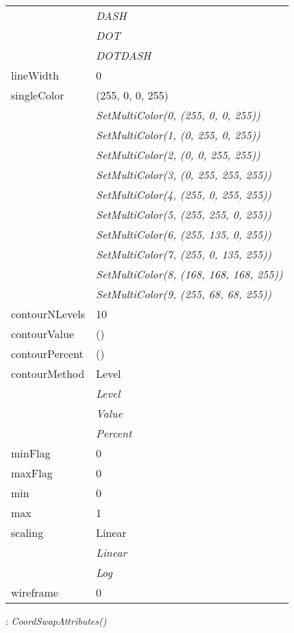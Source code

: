 \documentclass[10pt,a4paper]{report}
\begin{document}
\begin{longtable}{lp{7.5cm}}
 & {\it  DASH} \\
 & {\it  DOT} \\
 & {\it  DOTDASH} \\
lineWidth  &  0 \\
singleColor  &  (255, 0, 0, 255) \\
 & {\it  SetMultiColor(0, (255, 0, 0, 255))} \\
 & {\it  SetMultiColor(1, (0, 255, 0, 255))} \\
 & {\it  SetMultiColor(2, (0, 0, 255, 255))} \\
 & {\it  SetMultiColor(3, (0, 255, 255, 255))} \\
 & {\it  SetMultiColor(4, (255, 0, 255, 255))} \\
 & {\it  SetMultiColor(5, (255, 255, 0, 255))} \\
 & {\it  SetMultiColor(6, (255, 135, 0, 255))} \\
 & {\it  SetMultiColor(7, (255, 0, 135, 255))} \\
 & {\it  SetMultiColor(8, (168, 168, 168, 255))} \\
 & {\it  SetMultiColor(9, (255, 68, 68, 255))} \\
contourNLevels  &  10 \\
contourValue  &  () \\
contourPercent  &  () \\
contourMethod  &  Level   \\
 & {\it  Level} \\
 & {\it  Value} \\
 & {\it  Percent} \\
minFlag  &  0 \\
maxFlag  &  0 \\
min  &  0 \\
max  &  1 \\
scaling  &  Linear   \\
 & {\it  Linear} \\
 & {\it  Log} \\
wireframe  &  0 \\
\end{longtable}

\newpage

{}
: {\it CoordSwapAttributes() }\\[-3mm]
\end{document}
